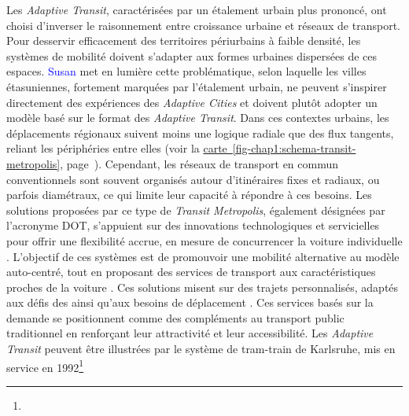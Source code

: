 \begin{refsegment}
Les \textsl{Adaptive Transit}, caractérisées par un étalement urbain plus prononcé, ont choisi d'inverser le raisonnement entre croissance urbaine et réseaux de transport. Pour desservir efficacement des territoires périurbains à faible densité, les systèmes de mobilité doivent s’adapter aux formes urbaines dispersées de ces espaces. \textcolor{blue}{Susan} \textcolor{blue}{\textcite[108]{handy_reviews_1999}} met en lumière cette problématique, selon laquelle les villes étasuniennes, fortement marquées par l’étalement urbain, ne peuvent s’inspirer directement des expériences des \textsl{Adaptive Cities} et doivent plutôt adopter un modèle basé sur le format des \textsl{Adaptive Transit}. Dans ces contextes urbains, les déplacements régionaux suivent moins une logique radiale que des flux tangents, reliant les périphéries entre elles (voir la \hyperref[fig-chap1:schema-transit-metropolis]{carte~\ref{fig-chap1:schema-transit-metropolis}}, page~\pageref{fig-chap1:schema-transit-metropolis}). Cependant, les réseaux de transport en commun conventionnels sont souvent organisés autour d’itinéraires fixes et radiaux, ou parfois diamétraux, ce qui limite leur capacité à répondre à ces besoins. Les solutions proposées par ce type de \textsl{Transit Metropolis}, également désignées par l’acronyme \acrfull{DOT}, s’appuient sur des innovations technologiques et servicielles pour offrir une flexibilité accrue, en mesure de concurrencer la voiture individuelle \textcolor{blue}{\autocite[132]{cervero_transit_2020}}. L’objectif de ces systèmes est de promouvoir une mobilité alternative au modèle auto-centré, tout en proposant des services de transport aux caractéristiques proches de la voiture \textcolor{blue}{\autocite[67-68]{bourdin_major_2024}}. Ces solutions misent sur des trajets personnalisés, adaptés aux défis des  ainsi qu’aux besoins de déplacement . Ces services basés sur la demande se positionnent comme des compléments au transport public traditionnel en renforçant leur attractivité et leur accessibilité. Les \textsl{Adaptive Transit} peuvent être illustrées par le système de tram-train de Karlsruhe, mis en service en 1992\footnote{
}
\end{refsegment}

